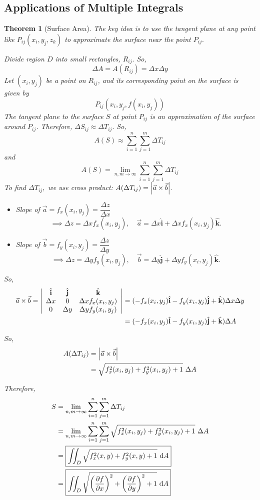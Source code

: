 \documentclass[12pt,a4paper]{article}
\newtheorem{thm}{Theorem}[subsection]
\def\dsst{\displaystyle}
\def\d{{\mathrm{d}}}
\def\dA{\d A}
\def\iintD{\dsst\iint_D}
\def\veca{\vec{a}}
\def\vecb{\vec{b}}
\def\veci{\hat{\boldsymbol{\textbf{i}}}}
\def\vecj{\hat{\boldsymbol{\textbf{j}}}}
\def\veck{\hat{\boldsymbol{\textbf{k}}}}
\begin{document}
\subsection{Applications of Multiple Integrals}
\begin{thm}[Surface Area]	
The key idea is to use the tangent plane at any point like $P_{ij}(x_i,y_j,z_k)$ to approximate the surface near the point $P_{ij}.$\par Divide region $D$ into small rectangles, $R_{ij}.$ So, \[\Delta A=A(R_{ij})=\Delta x\Delta y\] Let $(x_i, y_j)$ be a point on $R_{ij}$, and its corresponding point on the surface is given by \[P_{ij}(x_i, y_j, f(x_i,y_j))\] The tangent plane to the surface $S$ at point $P_{ij}$ is an approximation of the surface around $P_{ij}$. Therefore, $\Delta S_{ij}\approx\Delta T_{ij}.$ So, \[A(S)\approx\sum_{i=1}^n\sum_{j=1}^m\Delta T_{ij}\] and \[A(S)=\lim_{n,m\to\infty}\sum_{i=1}^n\sum_{j=1}^m\Delta T_{ij}\] To find $\Delta T_{ij},$ we use cross product: $A(\Delta T_{ij})=\qty|\veca\times\vecb|.$ 
	\begin{itemize}
		\item Slope of $\veca=f_x(x_i,y_j)=\dfrac{\Delta z}{\Delta x}$ \[\implies\Delta z=\Delta xf_x(x_i,y_j),\quad\veca=\Delta x\veci+\Delta xf_x(x_i,y_j)\veck.\]
		\item Slope of $\vecb=f_y(x_i,y_j)=\dfrac{\Delta z}{\Delta y}$ \[\implies\Delta z=\Delta yf_y(x_i,y_j),\quad\vecb=\Delta y\vecj+\Delta yf_y(x_i,y_j)\veck.\]
	\end{itemize}\par 
	So, \[\begin{aligned}\veca\times\vecb=\qty|\begin{array}{ccc}\veci&\vecj&\veck\\\Delta x&0&\Delta xf_x(x_i,y_j)\\0&\Delta y&\Delta yf_y(x_i,y_j)\end{array}|&=(-f_x(x_i,y_j)\veci-f_y(x_i,y_j)\vecj+\veck)\Delta x\Delta y\\&=(-f_x(x_i,y_j)\veci-f_y(x_i,y_j)\vecj+\veck)\Delta A\end{aligned}\]\par So, \[\begin{aligned}A(\Delta T_{ij})&=\qty|\veca\times\vecb|\\&=\sqrt{f_x^2(x_i,y_j)+f_y^2(x_i,y_j)+1}\ \Delta A\end{aligned}\]\par Therefore, \[\begin{aligned}S&=\lim_{n,m\to\infty}\sum_{i=1}^n\sum_{j=1}^m\Delta T_{ij}\\&=\lim_{n,m\to\infty}\sum_{i=1}^n\sum_{j=1}^m\sqrt{f_x^2(x_i,y_j)+f_y^2(x_i,y_j)+1}\ \Delta A\\&=\boxed{\iintD\sqrt{f_x^2(x,y)+f_y^2(x,y)+1}\ \dA}\\&=\boxed{\iintD\sqrt{\qty(\pdv{f}{x})^2+\qty(\pdv{f}{y})^2+1}\ \dA}\end{aligned}\]
\end{thm}
\end{document}
